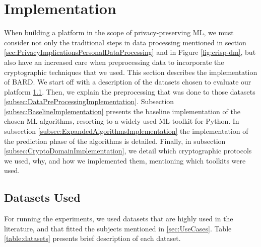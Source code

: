 
\section{Implementation}
\label{sec:Implementation}

When building a platform in the scope of privacy-preserving \ac{ML}, we must consider not only the traditional steps in data processing mentioned in section \ref{sec:PrivacyImplicationsPersonalDataProcessing} and in Figure \ref{fig:crisp-dm}, but also have an increased care when preprocessing data to incorporate the cryptographic techniques that we used.
This section describes the implementation of \ac{BARD}. We start off with a description of the datasets chosen to evaluate our platform \ref{subsec:DatasetsImplementation}. Then, we explain the preprocessing that was done to those datasets \ref{subsec:DataPreProcessingImplementation}.
Subsection \ref{subsec:BaselineImplementation} presents the baseline implementation of the chosen \ac{ML} algorithms, resorting to a widely used \ac{ML} toolkit for Python.
In subsection \ref{subsec:ExpandedAlgorithmsImplementation} the implementation of the prediction phase of the algorithms is detailed.
Finally, in subsection \ref{subsec:CryptoDomainImplementation}, we detail which cryptographic protocols we used, why, and how we implemented them, mentioning which toolkits were used.



\subsection{Datasets Used}
\label{subsec:DatasetsImplementation}

For running the experiments, we used datasets that are highly used in the literature, and that fitted the subjects mentioned in \ref{sec:UseCases}. Table \ref{table:datasets} presents brief description of each dataset.

